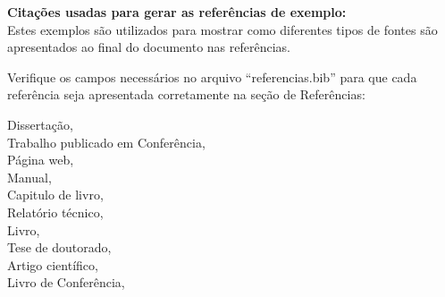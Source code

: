 \textbf{Citações usadas para gerar as referências de exemplo:}\\
Estes exemplos são utilizados para mostrar como diferentes tipos de
fontes são apresentados ao final do documento nas referências.

Verifique os campos necessários no arquivo ``referencias.bib'' para que 
cada referência seja apresentada corretamente na seção de Referências: 

Dissertação, \cite{almeida2022}\\
Trabalho publicado em Conferência, \cite{cbsoft2023}\\
Página web, \cite{ferreira2020}\\
Manual, \cite{latex2023}\\
Capitulo de livro, \cite{mendes2019}\\
Relatório técnico, \cite{oliveira2020}\\
Livro, \cite{linden2012}\\
Tese de doutorado, \cite{rodrigues2021}\\
Artigo científico, \cite{silva2023}\\
Livro de Conferência, \cite{souza2022}